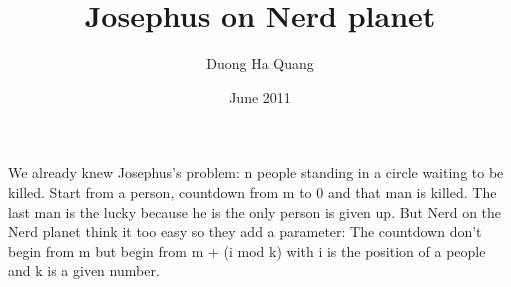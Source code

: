 \documentclass[14pt, a4paper]{article}
\begin{document}
\title{Josephus on Nerd planet}
\author{Duong Ha Quang}
\date{June 2011}
\maketitle
\newpage

We already knew Josephus's problem: n people standing in a circle waiting to be killed. Start from a person, countdown from m to 0 and that man is killed. The last man is the lucky because he is the only person is given up.\newline\newline
But Nerd on the Nerd planet think it too easy so they add a parameter:\newline
The countdown don't begin from m but begin from m + (i mod k) with i is the position of a people and k is a given number.
\end{document}
